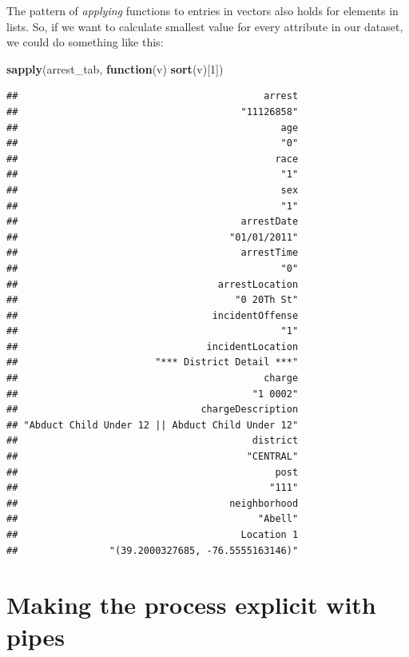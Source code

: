 \documentclass[12pt,]{book}
\newenvironment{Shaded}{\begin{snugshade}}{\end{snugshade}}
\newcommand{\KeywordTok}[1]{\textcolor[rgb]{0.13,0.29,0.53}{\textbf{#1}}}
\newcommand{\DecValTok}[1]{\textcolor[rgb]{0.00,0.00,0.81}{#1}}
\newcommand{\ControlFlowTok}[1]{\textcolor[rgb]{0.13,0.29,0.53}{\textbf{#1}}}
\newcommand{\NormalTok}[1]{#1}
\theoremstyle{definition}
\theoremstyle{definition}
\theoremstyle{definition}
\theoremstyle{remark}
\begin{document}
The pattern of \emph{applying} functions to entries in vectors also
holds for elements in lists. So, if we want to calculate smallest value
for every attribute in our dataset, we could do something like this:

\begin{Shaded}
\begin{Highlighting}[]
\KeywordTok{sapply}\NormalTok{(arrest_tab, }\ControlFlowTok{function}\NormalTok{(v) }\KeywordTok{sort}\NormalTok{(v)[}\DecValTok{1}\NormalTok{])}
\end{Highlighting}
\end{Shaded}

\begin{verbatim}
##                                           arrest 
##                                       "11126858" 
##                                              age 
##                                              "0" 
##                                             race 
##                                              "1" 
##                                              sex 
##                                              "1" 
##                                       arrestDate 
##                                     "01/01/2011" 
##                                       arrestTime 
##                                              "0" 
##                                   arrestLocation 
##                                      "0 20Th St" 
##                                  incidentOffense 
##                                              "1" 
##                                 incidentLocation 
##                        "*** District Detail ***" 
##                                           charge 
##                                         "1 0002" 
##                                chargeDescription 
## "Abduct Child Under 12 || Abduct Child Under 12" 
##                                         district 
##                                        "CENTRAL" 
##                                             post 
##                                            "111" 
##                                     neighborhood 
##                                          "Abell" 
##                                       Location 1 
##                "(39.2000327685, -76.5555163146)"
\end{verbatim}

\section{Making the process explicit with
pipes}\label{making-the-process-explicit-with-pipes}
\end{document}
